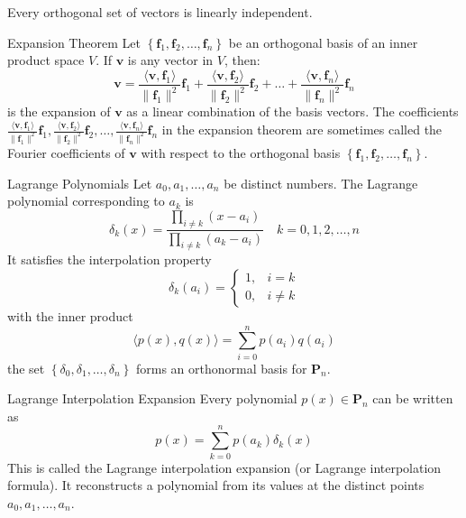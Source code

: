 \documentclass[12pt]{article}
\begin{document}
\begin{theorem}{}{}
    Every orthogonal set of vectors is linearly independent.
\end{theorem}

\begin{theorem}{Expansion Theorem}{}
    Let $ \left\{ \mathbf{f}_1, \mathbf{f}_2, \dots, \mathbf{f}_n \right\} $ be an orthogonal basis of an inner product space $ V $. If $ \mathbf{v} $ is any vector in $ V $, then:
    \[ \mathbf{v} = \frac{\langle \mathbf{v}, \mathbf{f}_1 \rangle}{\lVert \mathbf{f}_1 \rVert^2} \mathbf{f}_1 + \frac{\langle \mathbf{v}, \mathbf{f}_2 \rangle}{\lVert \mathbf{f}_2 \rVert^2} \mathbf{f}_2 + \dots + \frac{\langle \mathbf{v}, \mathbf{f}_n \rangle}{\lVert \mathbf{f}_n \rVert^2} \mathbf{f}_n \]
    is the expansion of $ \mathbf{v} $ as a linear combination of the basis vectors.
    \medskip
    \newline
    The coefficients $ \frac{\langle \mathbf{v}, \mathbf{f}_1 \rangle}{\lVert \mathbf{f}_1 \rVert^2} \mathbf{f}_1, \frac{\langle \mathbf{v}, \mathbf{f}_2 \rangle}{\lVert \mathbf{f}_2 \rVert^2} \mathbf{f}_2, \dots, \frac{\langle \mathbf{v}, \mathbf{f}_n \rangle}{\lVert \mathbf{f}_n \rVert^2} \mathbf{f}_n $ in the expansion theorem are sometimes called the Fourier coefficients of $ \mathbf{v} $ with respect to the orthogonal basis $ \left\{ \mathbf{f}_1, \mathbf{f}_2, \dots, \mathbf{f}_n \right\} $.
\end{theorem}

\begin{definition}{Lagrange Polynomials}{}
    Let $ a_0, a_1, \dots, a_n $ be distinct numbers. The Lagrange polynomial corresponding to $ a_k $ is
    \[ \delta_k \left( x \right) = \frac{\prod_{i \neq k} \left( x - a_i \right)}{\prod_{i \neq k} \left( a_k - a_i \right)} \quad k = 0, 1, 2, \dots, n \]
    It satisfies the interpolation property
    \[ \delta_k \left( a_i \right) = \begin{cases} 1, & i = k \\ 0, & i \neq k \end{cases} \]
    with the inner product
    \[ \langle p \left( x \right), q \left( x \right) \rangle = \sum_{i = 0}^n p \left( a_i \right) q \left( a_i \right) \]
    the set $ \left\{ \delta_0, \delta_1, \dots, \delta_n \right\} $ forms an orthonormal basis for $ \mathbf{P}_n $.
\end{definition}

\begin{definition}{Lagrange Interpolation Expansion}{}
    Every polynomial $ p \left( x \right) \in \mathbf{P}_n $ can be written as
    \[ p \left( x \right) = \sum_{k = 0}^n p \left( a_k \right) \delta_k \left( x \right) \]
    This is called the Lagrange interpolation expansion (or Lagrange interpolation formula). It reconstructs a polynomial from its values at the distinct points $ a_0, a_1, \dots, a_n $.
\end{definition}
\end{document}
